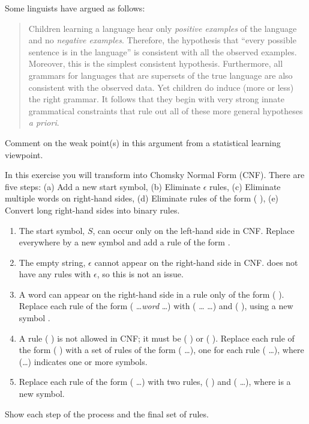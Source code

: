 \begin{iexercise} %
Some linguists have argued as follows:
\begin{quote} Children learning
a language hear only {\em positive examples} of the language and no
{\em negative examples}. Therefore, the hypothesis that ``every
possible sentence is in the language'' is consistent with all the
observed examples.  Moreover, this is the simplest consistent
hypothesis. Furthermore, all grammars for languages that are supersets
of the true language are also consistent with the observed data. Yet
children do induce (more or less) the right grammar. It follows that
they begin with very strong innate grammatical constraints that rule out 
all of these more general hypotheses {\em a priori}.
\end{quote}
Comment on the weak point(s) in this argument from a statistical learning viewpoint.
\end{iexercise} 

\begin{exercise}
In this exercise you will transform  into Chomsky Normal Form (CNF). There are five steps:
(a) Add a new start symbol, (b) Eliminate \(\epsilon\) rules, 
(c) Eliminate multiple words on right-hand sides,
(d) Eliminate rules of the form ( \bnfeq {}),
(e) Convert long right-hand sides into binary rules.  
\begin{enumerate}
\item The start symbol, \(S\), can  occur only on the left-hand side in CNF. 
Replace  everywhere by a new symbol  and add a rule of the form  \bnfeq {}.
\item The empty string, \(\epsilon\) cannot appear on the right-hand side in CNF.  does not have any rules with \(\epsilon\), 
so this is not an issue.
\item A word can appear on the right-hand side in a rule only of the form ( ). 
Replace each rule of
the form ( \bnfeq \ldots {\em word} \ldots) with ( \bnfeq \ldots {} \ldots) and ( ),
using a new symbol .
\item A rule ( \bnfeq {}) is not allowed in CNF; it must be ( \bnfeq {} ) or ( ).
Replace each rule of the form ( \bnfeq {}) with a set of rules of the form ( \bnfeq \ldots),
one for each rule  ( \bnfeq \ldots), where (\ldots) indicates one or more symbols.
\item Replace each rule of the form ( \bnfeq {}  \ldots) with two rules, ( \bnfeq {} )
and ( \bnfeq {} \ldots), where  is a new symbol.
\end{enumerate}
Show each step of the process and the final set of rules.
\end{exercise} 

